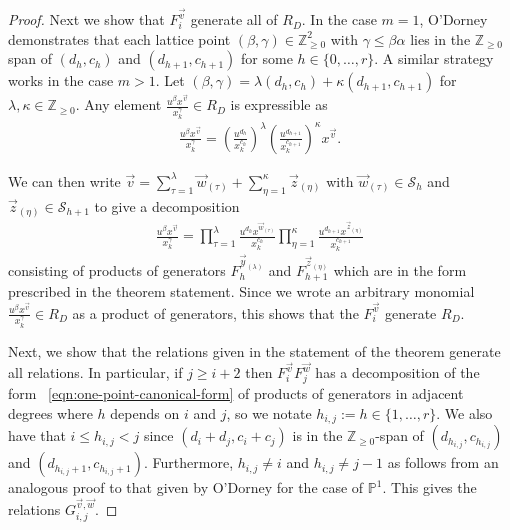 \documentclass{amsart}
\theoremstyle{plain}
\theoremstyle{definition}
\theoremstyle{remark}
\numberwithin{equation}{section}
\newcommand\bp{{\mathbb P}}
\newcommand\bz{{\mathbb Z}}
\newcommand\mss{\mathscr{S}}
\begin{document}
\begin{proof}
Next we show that $F^{\vec v}_i$ generate all of $R_D$. In the case $m = 1$, O'Dorney \cite[Theorem 6]
{dorney:canonical} demonstrates that each lattice point $(\beta, \gamma) \in
\bz_{\geq 0}^2$ with $\gamma \leq \beta \alpha$ lies in the $\bz_{\geq 0}$ span
of $(d_h, c_h)$ and $(d_{h + 1}, c_{h + 1})$ for
some $h \in \{0, \ldots, r\}$. A similar strategy works in the case $m > 1$. Let $(\beta, \gamma) = \lambda
(d_h, c_h) + \kappa (d_{h + 1}, c_{h + 1})$ for $\lambda, \kappa \in
\bz_{\geq 0}$. Any element $\frac{u^{\beta}
x^{\vec{v}}} {x_k^{ \gamma}} \in R_D$ is expressible as
\begin{align*}
	\frac{u^{\beta} x^{\vec{v}}} {x_k^{\gamma}} = \left(\frac{u^{d_h}}
	{x_k^{c_h}}\right)^{\lambda} \left(\frac{u^{d_{h + 1}}}
	{x_k^{c_{h + 1}}}\right)^{\kappa} x^{\vec{v}}.
\end{align*}

\noindent
We can then write $\vec{v}  = \sum_{\tau=1}^{\lambda}\vec{w}_{(\tau)} +
\sum_{\eta=1}^{\kappa} \vec z_{(\eta)}$ with $\vec w_{(\tau)} \in \mss_h$ and
$\vec z_{(\eta)} \in \mss_{h+1}$ to give a decomposition
\begin{align}
\label{eqn:one-point-canonical-form}
	\frac{u^{\beta} x^{\vec{v}}} {x_k^{\gamma}}	= \prod_{\tau = 1}
	^{\lambda} \frac{u^{d_h} x^{\vec{w}_{(\tau)}}} {x_k^{c_h}}
	\prod_{\eta = 1}^{\kappa} \frac{u^{d_{h + 1}} x^{\vec{z}_{(\eta)}}}
	{x_k^{c_{h + 1}}}
\end{align}
\noindent
consisting of products of generators $F_h^{\vec{y}_{(\lambda)}}$
and $F_{h + 1}^{\vec{z}_{(\eta)}}$ which are in the form
prescribed in the theorem statement. Since we wrote an arbitrary monomial
$\frac{u^{\beta} x^{\vec{v}}}{x_k^\gamma} \in R_D$ as a product of generators,
this shows that the $F_i^{\vec v}$ generate $R_D$.

Next, we show that the relations given in the statement of the theorem generate all relations. 
In particular, if $j \geq i + 2$ then $F_i^{\vec{v}} F_j^{\vec{w}}$
has a decomposition of the form ~\eqref{eqn:one-point-canonical-form} of 
products of generators in adjacent degrees where $h$
depends on $i$ and $ j$, so we notate $h_{i, j} := h \in \{1, \ldots, r\}$. We 
also have that $i \leq h_{i, j} < j$ since $(d_i + d_j, c_i + c_j)$ is in the
$\bz_{\geq 0}$-span of $(d_{h_{i, j}}, c_{h_{i, j}})$ and
$(d_{h_{i, j} + 1}, c_{h_{i, j} + 1})$. Furthermore,
$h_{i, j} \neq i$ and $h_{i, j} \neq j - 1$
as follows from an analogous proof to that given by O'Dorney
\cite[Theorem 6]{dorney:canonical} for the case of
$\bp^1$. This gives the relations
$G_{i, j}^{\vec{v}, \vec{w}}$.


\end{proof}
\end{document}
